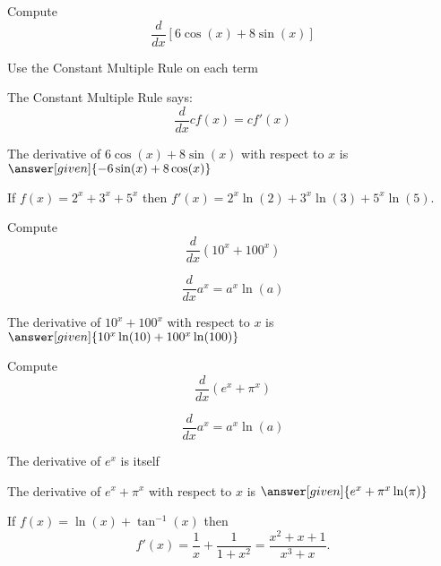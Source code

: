 \documentclass{ximera}
\begin{document}
\begin{problem} %
  Compute 
  \[
  \frac{d}{dx} \left[6\cos(x) + 8\sin(x)\right]
  \]
  
		\begin{hint}
      Use the Constant Multiple Rule on each term
    \end{hint}
    \begin{hint}
      The Constant Multiple Rule says:
      \[
      \frac{d}{dx} cf(x) = cf'(x)
      \]
    \end{hint}    
		The derivative of $6\cos(x) + 8\sin(x)$ with respect to $x$ is
		 $\answer[given]{-6\sin(x) + 8\cos(x)}$
	
\end{problem}


\begin{example} %
 If $f(x) = 2^x + 3^x + 5^x$ then $f'(x) = 2^x\ln(2) + 3^x\ln(3) + 5^x\ln(5)$.
\end{example}


\begin{problem} %
  Compute 
  \[
  \frac{d}{dx} \left(10^x + 100^x\right)
  \]
  
    \begin{hint}
      \[
      \frac{d}{dx} a^x = a^x \ln(a)
      \]
    \end{hint}    
		The derivative of $10^x + 100^x$ with respect to $x$ is
		 $\answer[given]{10^x \ln(10) + 100^x \ln(100)}$
	
\end{problem}

\begin{problem} %
  Compute 
  \[
  \frac{d}{dx} \left(e^x + \pi^x\right)
  \]
  
    \begin{hint}
      \[
      \frac{d}{dx} a^x = a^x \ln(a)
      \]
    \end{hint}
		\begin{hint}
		  The derivative of $e^x$ is itself
		\end{hint}
		The derivative of $e^x + \pi^x$ with respect to $x$ is
		 $\answer[given]{e^x  + \pi^x \ln(\pi)}$
	
\end{problem}


\begin{example} %
 If $f(x) = \ln(x) + \tan^{-1}(x)$ then 
\[f'(x) = \frac{1}{x} + \frac{1}{1+x^2} = \frac{x^2 + x + 1}{x^3 + x}.\]
\end{example}
\end{document}
